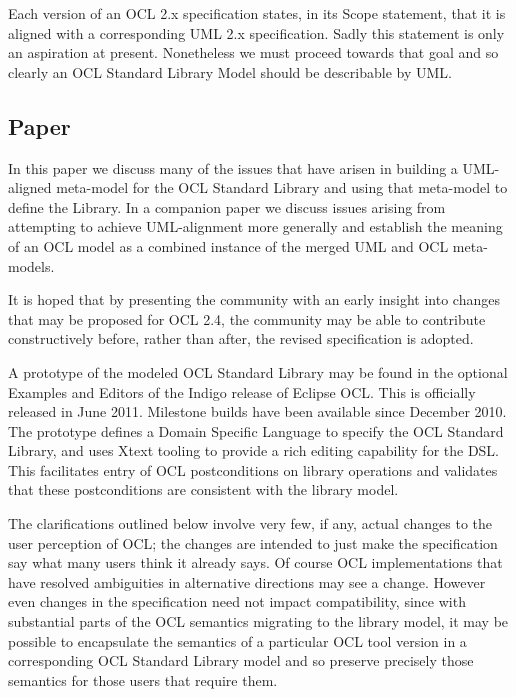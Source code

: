 \documentclass{eceasst}
\begin{document}
Each version of an OCL 2.x specification states, in its Scope statement, that it is aligned with a corresponding UML 2.x specification. Sadly this statement is only an aspiration at present. Nonetheless we must proceed towards that goal and so clearly an OCL Standard Library Model should be describable by UML.

\subsection{Paper}

In this paper we discuss many of the issues that have arisen in building a UML-aligned meta-model for the OCL Standard Library and using that meta-model to define the Library. In a companion paper\cite{OCL-UML} we discuss issues arising from attempting to achieve UML-alignment more generally and establish the meaning of an OCL model as a combined instance of the merged UML and OCL meta-models.

It is hoped that by presenting the community with an early insight into changes that may be proposed for OCL 2.4, the community may be able to contribute constructively before, rather than after, the revised specification is adopted.

A prototype of the modeled OCL Standard Library may be found in the optional Examples and Editors of the Indigo release of Eclipse OCL\cite{MDT/OCL}. This is officially released in June 2011. Milestone builds have been available since December 2010. The prototype defines a Domain Specific Language to specify the OCL Standard Library, and uses Xtext\cite{TMF/Xtext} tooling to provide a rich editing capability for the DSL. This facilitates entry of OCL postconditions on library operations and validates that these postconditions are consistent with the library model.

The clarifications outlined below involve very few, if any, actual changes to the user perception of OCL; the changes are intended to just make the specification say what many users think it already says. Of course OCL implementations that have resolved ambiguities in alternative directions may see a change. However even changes in the specification need not impact compatibility, since with substantial parts of the OCL semantics migrating to the library model, it may be possible to encapsulate the semantics of a particular OCL tool version in a corresponding OCL Standard Library model and so preserve precisely those semantics for those users that require them.
\end{document}
